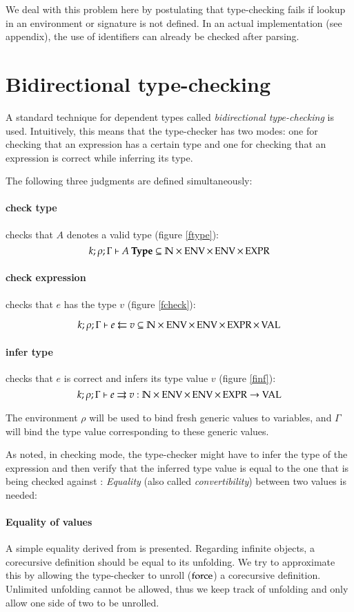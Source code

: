 We deal with this problem here by postulating that type-checking fails if lookup in an environment or signature is not defined.
In an actual implementation (see appendix), the use of identifiers can already be checked after parsing. 

\section{Bidirectional type-checking} 
A standard technique for dependent types called \emph{bidirectional type-checking} is used.
Intuitively, this means that the type-checker has two modes:
one for checking that an expression has a certain type and one for checking that an expression is correct while inferring its type.

\noindent The following three judgments are defined simultaneously:
\paragraph*{check type} checks that $A$ denotes a valid type (figure \ref{ftype}): 
\[k;\rho;\Gamma\vdash A\:\mathbf{Type} \subseteq \mathbb{N} \times \operatorname{ENV} \times \operatorname{ENV} \times \operatorname{EXPR} \]

\paragraph*{check expression} checks that $e$ has the type $v$ (figure \ref{fcheck}):

\[k;\rho;\Gamma\vdash e\leftleftarrows v \subseteq \mathbb{N} \times \operatorname{ENV} \times \operatorname{ENV} \times \operatorname{EXPR} \times \operatorname{VAL}\]

\paragraph*{infer type} checks that $e$ is correct and infers its type value $v$ (figure \ref{finf}):
\[k;\rho;\Gamma\vdash e\rightrightarrows v : \mathbb{N} \times \operatorname{ENV} \times \operatorname{ENV} \times \operatorname{EXPR} \rightarrow \operatorname{VAL}\]


The environment $\rho$ will be used to bind fresh generic values to variables, and $\Gamma$ will bind the type value corresponding to these generic values.

As noted, in checking mode, the type-checker might have to infer the type of the expression and then verify that the inferred type value is equal to the one that is being checked against : \emph{Equality} (also called \emph{convertibility}) between two values is needed:

\paragraph*{Equality of values}
A simple equality derived from \cite{coquand96algorithm} is presented. 
Regarding infinite objects, a corecursive definition should be equal to its unfolding.
We try to approximate this by allowing the type-checker to unroll ($\operatorname{force}$) a corecursive definition. Unlimited unfolding cannot be allowed, thus we keep track of unfolding and only allow one side of two to be unrolled.

